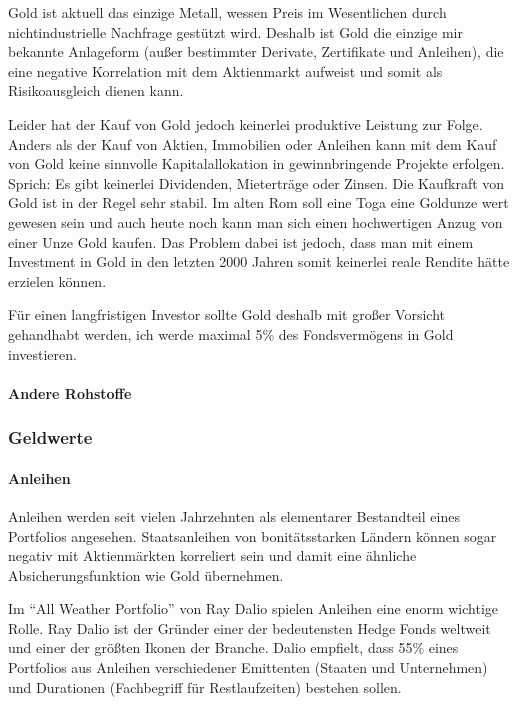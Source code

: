 \documentclass{article}
\begin{document}
Gold ist aktuell das einzige Metall, wessen Preis im Wesentlichen durch nichtindustrielle Nachfrage gestützt wird. Deshalb ist Gold die einzige mir bekannte Anlageform (außer bestimmter Derivate, Zertifikate und Anleihen), die eine negative Korrelation mit dem Aktienmarkt aufweist und somit als Risikoausgleich dienen kann.

Leider hat der Kauf von Gold jedoch keinerlei produktive Leistung zur Folge. Anders als der Kauf von Aktien, Immobilien oder Anleihen kann mit dem Kauf von Gold keine sinnvolle Kapitalallokation in gewinnbringende Projekte erfolgen. Sprich: Es gibt keinerlei Dividenden, Mieterträge oder Zinsen. Die Kaufkraft von Gold ist in der Regel sehr stabil. Im alten Rom soll eine Toga eine Goldunze wert gewesen sein und auch heute noch kann man sich einen hochwertigen Anzug von einer Unze Gold kaufen. Das Problem dabei ist jedoch, dass man mit einem Investment in Gold in den letzten 2000 Jahren somit keinerlei reale Rendite hätte erzielen können.

Für einen langfristigen Investor sollte Gold deshalb mit großer Vorsicht gehandhabt werden, ich werde maximal 5\% des Fondsvermögens in Gold investieren.

\paragraph{Andere Rohstoffe}



\subsubsection{Geldwerte}

\paragraph{Anleihen}

Anleihen werden seit vielen Jahrzehnten als elementarer Bestandteil eines Portfolios angesehen. Staatsanleihen von bonitätsstarken Ländern können sogar negativ mit Aktienmärkten korreliert sein und damit eine ähnliche Absicherungsfunktion wie Gold übernehmen.

Im ``All Weather Portfolio'' von Ray Dalio spielen Anleihen eine enorm wichtige Rolle. Ray Dalio ist der Gründer einer der bedeutensten Hedge Fonds weltweit und einer der größten Ikonen der Branche. Dalio empfielt, dass 55\% eines Portfolios aus Anleihen verschiedener Emittenten (Staaten und Unternehmen) und Durationen (Fachbegriff für Restlaufzeiten) bestehen sollen.
\end{document}
